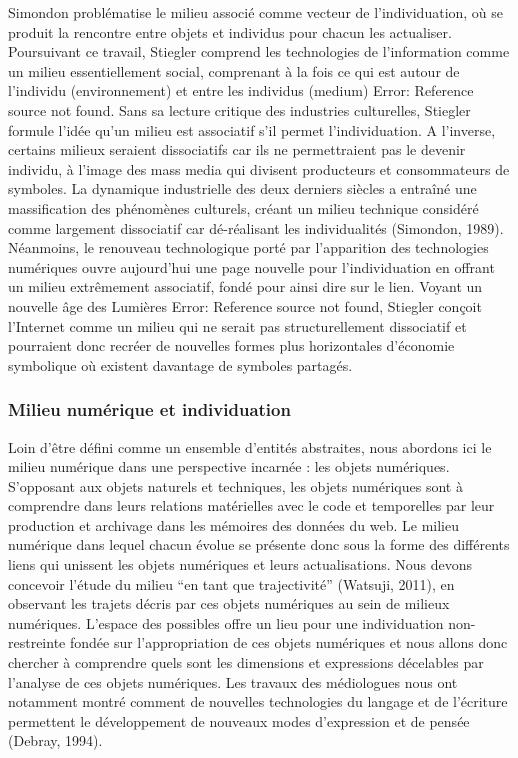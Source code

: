 Simondon problématise le milieu associé comme vecteur de l’individuation, où se produit la rencontre entre objets et individus pour chacun les actualiser. Poursuivant ce travail, Stiegler comprend les technologies de l’information comme un milieu essentiellement social, comprenant à la fois ce qui est autour de l’individu (environnement) et entre les individus (medium) Error: Reference source not found. Sans sa lecture critique des industries culturelles, Stiegler formule l’idée qu’un milieu est associatif s’il permet l’individuation. A l’inverse, certains milieux seraient dissociatifs car ils ne permettraient pas le devenir individu, à l’image des mass media qui divisent producteurs et consommateurs de symboles. La dynamique industrielle des deux derniers siècles a entraîné une massification des phénomènes culturels, créant un milieu technique considéré comme largement dissociatif car dé-réalisant les individualités (Simondon, 1989). Néanmoins, le renouveau technologique porté par l’apparition des technologies numériques ouvre aujourd’hui une page nouvelle pour l’individuation en offrant un milieu extrêmement associatif, fondé pour ainsi dire sur le lien. Voyant un nouvelle âge des Lumières Error: Reference source not found, Stiegler conçoit l’Internet comme un milieu qui ne serait pas structurellement dissociatif et pourraient donc recréer de nouvelles formes plus horizontales d’économie symbolique où existent davantage de symboles partagés. 

\subsubsection[Milieu numérique et individuation]{Milieu numérique et individuation}
Loin d’être défini comme un ensemble d’entités abstraites, nous abordons ici le milieu numérique dans une perspective incarnée : les objets numériques. S’opposant aux objets naturels et techniques, les objets numériques sont à comprendre dans leurs relations matérielles avec le code et temporelles par leur production et archivage dans les mémoires des données du web. Le milieu numérique dans lequel chacun évolue se présente donc sous la forme des différents liens qui unissent les objets numériques et leurs actualisations. Nous devons concevoir l’étude du milieu “en tant que trajectivité” (Watsuji, 2011), en observant les trajets décris par ces objets numériques au sein de milieux numériques. L’espace des possibles offre un lieu pour une individuation non-restreinte fondée sur l’appropriation de ces objets numériques et nous allons donc chercher à comprendre quels sont les dimensions et expressions décelables par l’analyse de ces objets numériques. Les travaux des médiologues nous ont notamment montré comment de nouvelles technologies du langage et de l’écriture permettent le développement de nouveaux modes d’expression et de pensée (Debray, 1994). 

